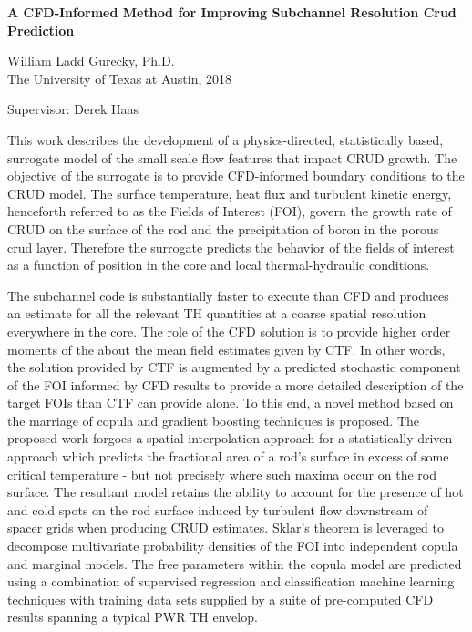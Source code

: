 
\begin{center}
	\large{
		\bf{A CFD-Informed Method for Improving Subchannel Resolution Crud Prediction}
	}
	\vspace{1cm}
	
	\small{	

	William Ladd Gurecky, Ph.D. \\
	The University of Texas at Austin, 2018
   
    \vspace{1cm} 
   	Supervisor:  Derek Haas
    }
\end{center}
\vspace{1cm}

\small{
This work describes the development of a physics-directed, statistically based,
surrogate model of the small scale flow features that impact CRUD growth. The objective of the surrogate
is to provide CFD-informed boundary conditions to the CRUD model. The surface temperature, heat
flux and turbulent kinetic energy, henceforth referred to as the Fields of Interest (FOI),
govern the growth rate of CRUD on the surface of the rod and the
precipitation of boron in the porous crud layer. Therefore the surrogate predicts the behavior of the
fields of interest as a function of position in the core and local thermal-hydraulic conditions.

The subchannel code is substantially faster to execute than CFD
and produces an estimate for all the relevant TH quantities at a coarse spatial resolution everywhere in
the core. The role of the CFD solution is to provide higher order moments of the about the mean field estimates
given by CTF. In other words, the solution provided by CTF is augmented by a predicted stochastic
component of the FOI informed by CFD results to provide a more detailed description of the target
FOIs than CTF can provide alone. To this end, a novel method based on the marriage of copula and
gradient boosting techniques is proposed. The proposed work forgoes a spatial interpolation approach
for a statistically driven approach which predicts the fractional area of a rod’s surface in excess of some
critical temperature - but not precisely where such maxima occur on the rod surface.
The resultant model retains the ability to account for the presence
of hot and cold spots on the rod surface induced by turbulent flow downstream of spacer grids when
producing CRUD estimates. Sklar’s theorem is leveraged to decompose multivariate probability densities
of the FOI into independent copula and marginal models. The free parameters within the copula model
are predicted using a combination of supervised regression and classification machine learning techniques
with training data sets supplied by a suite of pre-computed CFD results spanning a typical PWR TH
envelop.
}